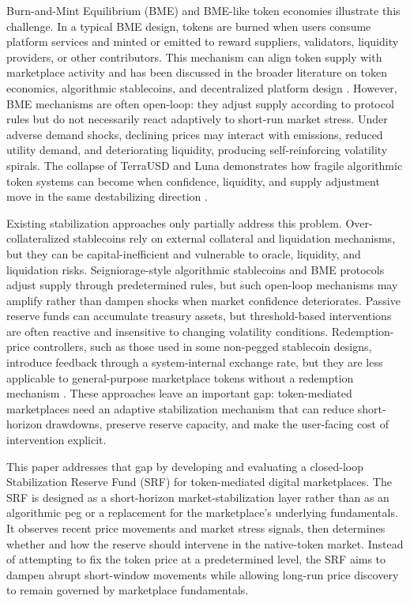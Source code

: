 \documentclass[a4paper,fleqn]{cas-dc}
\begin{document}
Burn-and-Mint Equilibrium (BME) and BME-like token economies illustrate this challenge. In a typical BME design, tokens are burned when users consume platform services and minted or emitted to reward suppliers, validators, liquidity providers, or other contributors. This mechanism can align token supply with marketplace activity and has been discussed in the broader literature on token economics, algorithmic stablecoins, and decentralized platform design \cite{klages2020stablecoins,cong2021tokenomics,sockin2023decentralization}. However, BME mechanisms are often open-loop: they adjust supply according to protocol rules but do not necessarily react adaptively to short-run market stress. Under adverse demand shocks, declining prices may interact with emissions, reduced utility demand, and deteriorating liquidity, producing self-reinforcing volatility spirals. The collapse of TerraUSD and Luna demonstrates how fragile algorithmic token systems can become when confidence, liquidity, and supply adjustment move in the same destabilizing direction \cite{terra_anatomy}.

Existing stabilization approaches only partially address this problem. Over-collateralized stablecoins rely on external collateral and liquidation mechanisms, but they can be capital-inefficient and vulnerable to oracle, liquidity, and liquidation risks. Seigniorage-style algorithmic stablecoins and BME protocols adjust supply through predetermined rules, but such open-loop mechanisms may amplify rather than dampen shocks when market confidence deteriorates. Passive reserve funds can accumulate treasury assets, but threshold-based interventions are often reactive and insensitive to changing volatility conditions. Redemption-price controllers, such as those used in some non-pegged stablecoin designs, introduce feedback through a system-internal exchange rate, but they are less applicable to general-purpose marketplace tokens without a redemption mechanism \cite{rai_pid_analysis,flatcoin_control_theory,strohmeyer2024improving}. These approaches leave an important gap: token-mediated marketplaces need an adaptive stabilization mechanism that can reduce short-horizon drawdowns, preserve reserve capacity, and make the user-facing cost of intervention explicit.

This paper addresses that gap by developing and evaluating a closed-loop Stabilization Reserve Fund (SRF) for token-mediated digital marketplaces. The SRF is designed as a short-horizon market-stabilization layer rather than as an algorithmic peg or a replacement for the marketplace's underlying fundamentals. It observes recent price movements and market stress signals, then determines whether and how the reserve should intervene in the native-token market. Instead of attempting to fix the token price at a predetermined level, the SRF aims to dampen abrupt short-window movements while allowing long-run price discovery to remain governed by marketplace fundamentals.
\end{document}
